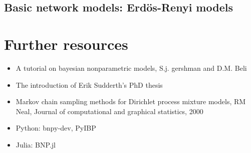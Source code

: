\subsection{Basic network models: Erdös-Renyi models}

\section{Further resources}

\begin{itemize}
  \item A tutorial on bayesian nonparametric models, S.j. gershman and D.M.
    Beli
  \item The introduction of Erik Sudderth's PhD thesis
  \item Markov chain sampling methods for Dirichlet process mixture models, RM
    Neal, Journal of computational and graphical statistics, 2000
  \item Python: bnpy-dev, PyIBP
  \item Julia: BNP.jl
\end{itemize}
